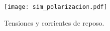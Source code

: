 \begin{figure}[H]
	\centering
	\texttt{[image: sim\_polarizacion.pdf]}
	\caption{Tensiones y corrientes de reposo.}
	\label{fig:sim_po}
	\end{figure}
